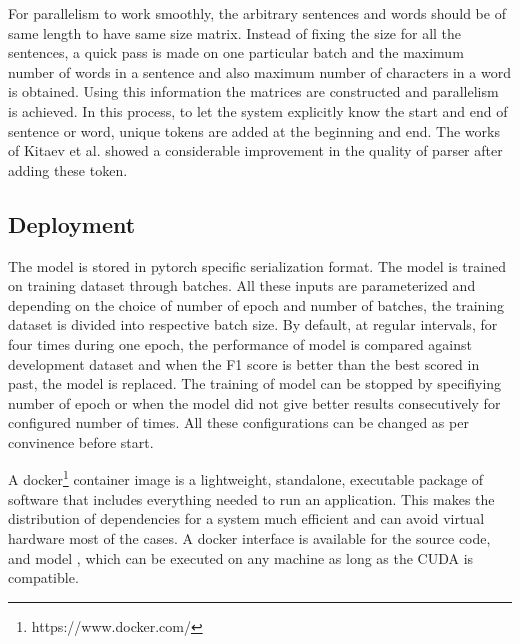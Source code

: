 \documentclass[a4paper, 11pt]{article}
\begin{document}
For parallelism to work smoothly, the arbitrary sentences and words should be of same length to have same size matrix. Instead of fixing the size for all the sentences, a quick pass is made on one particular batch and the maximum number of words in a sentence and also maximum number of characters in a word is obtained. Using this information the matrices are constructed and parallelism is achieved. In this process, to let the system explicitly know the start and end of sentence or word, unique tokens are added at the beginning and end. The works of  Kitaev et al. \parencite*{Kitaev2019} showed a considerable improvement in the quality of parser after adding these token.

\subsection{Deployment}

The model is stored in pytorch specific serialization format. The model is trained on training dataset through batches. All these inputs are parameterized and depending on the choice of number of epoch and number of batches, the training dataset is divided into respective batch size. By default, at regular intervals, for four times during one epoch, the performance of model is compared against development dataset and when the F1 score is better than the best scored in past, the model is replaced. The training of model can be stopped by specifiying number of epoch or when the model did not give better results consecutively for configured number of times. All these configurations can be changed as per convinence before start. 

A docker\footnote{https://www.docker.com/} container image is a lightweight, standalone, executable package of software that includes everything needed to run an application. This makes the distribution of dependencies for a system much efficient and can avoid virtual hardware most of the cases. A docker interface is available for the source code, and model , which can be executed on any machine as long as the CUDA is compatible. 
 



\end{document}
